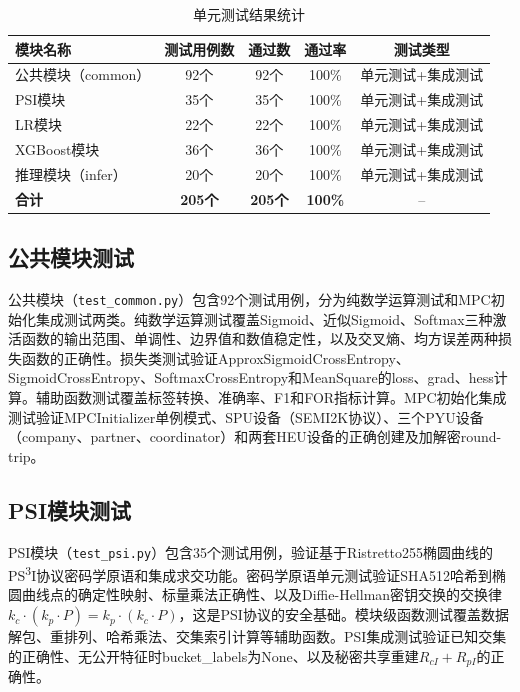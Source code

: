 \begin{table}[htbp]
    \centering
    \caption{单元测试结果统计}
    \label{tab:unit-test-result}
    \begin{tabular}{lcccc}
        \toprule
        \textbf{模块名称} & \textbf{测试用例数} & \textbf{通过数} & \textbf{通过率} & \textbf{测试类型} \\
        \midrule
        公共模块（common） & 92个 & 92个 & 100\% & 单元测试+集成测试 \\
        PSI模块 & 35个 & 35个 & 100\% & 单元测试+集成测试 \\
        LR模块 & 22个 & 22个 & 100\% & 单元测试+集成测试 \\
        XGBoost模块 & 36个 & 36个 & 100\% & 单元测试+集成测试 \\
        推理模块（infer） & 20个 & 20个 & 100\% & 单元测试+集成测试 \\
        \midrule
        \textbf{合计} & \textbf{205个} & \textbf{205个} & \textbf{100\%} & -- \\
        \bottomrule
    \end{tabular}
\end{table}

\subsection{公共模块测试}

公共模块（\texttt{test\_common.py}）包含92个测试用例，分为纯数学运算测试和MPC初始化集成测试两类。纯数学运算测试覆盖Sigmoid、近似Sigmoid、Softmax三种激活函数的输出范围、单调性、边界值和数值稳定性，以及交叉熵、均方误差两种损失函数的正确性。损失类测试验证ApproxSigmoidCrossEntropy、SigmoidCrossEntropy、SoftmaxCrossEntropy和MeanSquare的loss、grad、hess计算。辅助函数测试覆盖标签转换、准确率、F1和FOR指标计算。MPC初始化集成测试验证MPCInitializer单例模式、SPU设备（SEMI2K协议）、三个PYU设备（company、partner、coordinator）和两套HEU设备的正确创建及加解密round-trip。

\subsection{PSI模块测试}

PSI模块（\texttt{test\_psi.py}）包含35个测试用例，验证基于Ristretto255椭圆曲线的PS\textsuperscript{3}I协议密码学原语和集成求交功能。密码学原语单元测试验证SHA512哈希到椭圆曲线点的确定性映射、标量乘法正确性、以及Diffie-Hellman密钥交换的交换律$k_c \cdot (k_p \cdot P) = k_p \cdot (k_c \cdot P)$，这是PSI协议的安全基础。模块级函数测试覆盖数据解包、重排列、哈希乘法、交集索引计算等辅助函数。PSI集成测试验证已知交集的正确性、无公开特征时bucket\_labels为None、以及秘密共享重建$R_{cI} + R_{pI}$的正确性。

